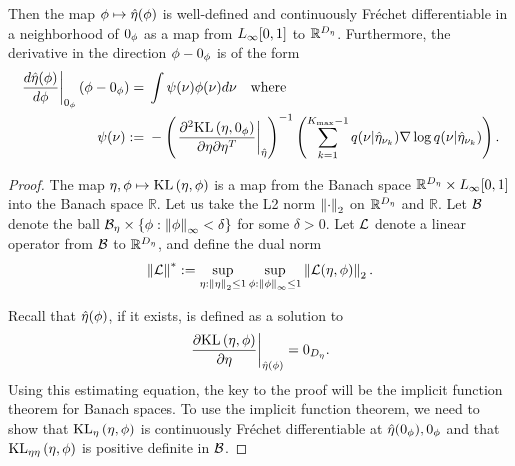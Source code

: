 \begin{thm}
%
Then the map $\phi \mapsto \hat\eta(\phi)$ is well-defined and continuously
Fr{\'e}chet differentiable in a neighborhood of $0_\phi$ as a map from ${L_{\infty}[0,1]}$ to
$\mathbb{R}^{D_{\eta}}$. Furthermore, the derivative in the direction $\phi -
0_\phi$ is of the form
%
\begin{align*}
%
\fracat{d \etaopt(\phi)}{d\phi}{\phiz}\left( \phi - \phiz\right) ={}&
    \int \infl(\nu) \phi(\nu) d\nu \mathtxt{where} \\
%
\infl(\nu) :={}&
-\left(\fracat{\partial^2 \KL{\eta, \phiz}}
                {\partial \eta \partial \eta^T}
                {\etaopt}\right)^{-1}
\left(
    \sumkm
    \q(\nu \vert \etaoptnuk)
    \nabla \log \q(\nu \vert \etaoptnuk)
\right).
%
\end{align*}
%

%

\begin{proof}
%
The map $\eta, \phi \mapsto \mathrm{KL}\left(\eta, \phi\right)$ is a map from the Banach space
$\mathbb{R}^{D_{\eta}} \times {L_{\infty}[0,1]}$ into the Banach space $\mathbb{R}$. Let us
take the L2 norm $\left\Vert\cdot\right\Vert_2$ on $\mathbb{R}^{{D_{\eta}}}$ and $\mathbb{R}$.
Let $\mathcal{B}$ denote the ball $\mathcal{B}_\eta \times \{ \phi: \left\Vert\phi\right\Vert_{\infty} <
\delta\}$ for some $\delta > 0$.  Let $\mathcal{L}$ denote a linear operator from
$\mathcal{B}$ to $\mathbb{R}^{D_{\eta}}$, and define the dual norm
%
\begin{align*}
%
\norm{\linop}^* :=
    \sup_{\eta: \norm{\eta}_2 \le 1} \sup_{\phi: \norminf{\phi} \le 1}
     \norm{\linop(\eta, \phi)}_2.
%
\end{align*}

Recall that $\hat\eta(\phi)$, if it exists, is defined as a solution to
%
\begin{align*}
%
\fracat{\partial \KL{\eta, \phi}}
                {\partial \eta}
                {\etaopt(\phi)} = 0_\etadim.
%
\end{align*}
%
Using this estimating equation, the key to the proof will be the implicit
function theorem for Banach spaces. To use the implicit function theorem, we
need to show that $\mathrm{KL}_{\eta}\left(\eta, \phi\right)$ is continuously Fr{\'e}chet
differentiable at $\hat\eta(0_\phi), 0_\phi$ and that $\mathrm{KL}_{\eta\eta}\left(\eta, \phi\right)$ is
positive definite in $\mathcal{B}$.


\end{proof}
\end{thm}
